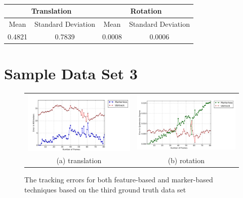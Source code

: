\begin{table}[H]
\centering
  \begin{tabular}{| c | c | c | c |}
      \hline
      \multicolumn{2}{|c|}{Translation} & \multicolumn{2}{c}{Rotation} \\ \hline
       Mean & Standard Deviation & Mean & Standard Deviation \\ \hline
      0.4821 & 0.7839 & 0.0008 & 0.0006 \\ \hline
  \end{tabular}
  \caption{} \label{tab:sample_02_diff}
\end{table}

\section{Sample Data Set 3} \label{subsec:sample_3}
\begin{figure}[H]
\begin{tabular}{cc}
  \includegraphics[width=80mm]{figures/frame_600/graph_translation} &  \includegraphics[width=80mm]{figures/frame_600/graph_rotation} \\
(a) translation & (b) rotation \\[6pt]
\end{tabular}
\caption{The tracking errors for both feature-based and marker-based techniques based on the third ground truth data set}\label{fig:sample_03}
\end{figure}

